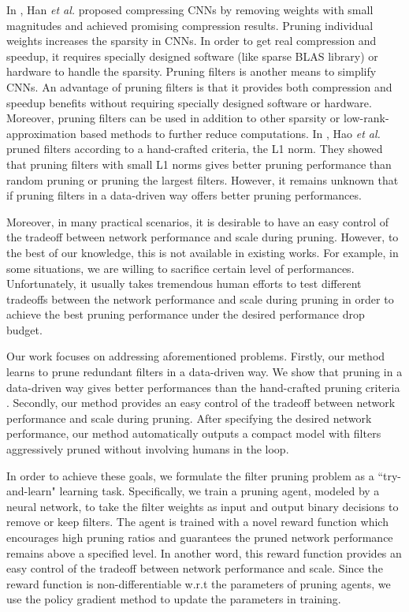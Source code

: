 \documentclass[10pt,twocolumn,letterpaper]{article}
\begin{document}
In  \cite{han_both,han_deep} , Han  \textit{et al.} proposed compressing CNNs by removing weights with small magnitudes and achieved promising compression results. Pruning individual weights increases the sparsity in CNNs. In order to get real compression and speedup, it requires specially designed software (like sparse BLAS library) or hardware \cite{eie} to handle the sparsity. Pruning filters is another means to simplify CNNs. An advantage of pruning filters is that it provides both compression and speedup benefits without requiring specially designed software or hardware. Moreover, pruning filters can be used in addition to other sparsity or low-rank-approximation based methods to further reduce computations. In \cite{iclr17}, Hao \textit{et al.} pruned filters according to a hand-crafted criteria, the L1 norm. They showed that pruning filters with small L1 norms gives better pruning performance than random pruning or pruning the largest filters. However, it remains unknown that if pruning filters in a data-driven way offers better pruning performances. 

Moreover, in many practical scenarios, it is desirable to have an easy control of the tradeoff between network performance and scale during pruning. However, to the best of our knowledge, this is not available in existing works. For example, in some situations, we are willing to sacrifice certain level of performances. Unfortunately, it usually takes tremendous human efforts to test different tradeoffs between the network performance and scale during pruning in order to achieve the best pruning performance under the desired performance drop budget.



Our work focuses on addressing aforementioned problems. Firstly, our method learns to prune redundant filters in a data-driven way. We show that pruning in a data-driven way gives better performances than the hand-crafted pruning criteria \cite{iclr17}. Secondly, our method provides an easy control of the tradeoff between network performance and scale during pruning. After specifying the desired network performance, our method automatically outputs a compact model with filters aggressively pruned without involving humans in the loop.

In order to achieve these goals, we formulate the filter pruning problem as a ``try-and-learn" learning task. Specifically, we train a pruning agent, modeled by a neural network, to take the filter weights as input and output binary decisions to remove or keep filters. The agent is trained with a novel reward function which encourages high pruning ratios and guarantees the pruned network performance remains above a specified level. In another word, this reward function provides an easy control of the tradeoff between network performance and scale. Since the reward function is non-differentiable w.r.t the parameters of pruning agents, we use the policy gradient method \cite{pg, reinforce} to update the parameters in training.
\end{document}

